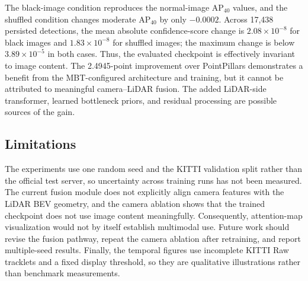 The black-image condition reproduces the normal-image AP$_{40}$ values, and
the shuffled condition changes moderate AP$_{40}$ by only $-0.0002$. Across
17,438 persisted detections, the mean absolute confidence-score change is
$2.08\times10^{-8}$ for black images and $1.83\times10^{-8}$ for shuffled
images; the maximum change is below $3.89\times10^{-5}$ in both cases. Thus,
the evaluated checkpoint is effectively invariant to image content. The
2.4945-point improvement over PointPillars demonstrates a benefit from the
MBT-configured architecture and training, but it cannot be attributed to
meaningful camera--LiDAR fusion. The added LiDAR-side transformer, learned
bottleneck priors, and residual processing are possible sources of the gain.

\subsection{Limitations}

The experiments use one random seed and the KITTI validation split rather
than the official test server, so uncertainty across training runs has not
been measured. The current fusion module does not explicitly align camera
features with the LiDAR BEV geometry, and the camera ablation shows that the
trained checkpoint does not use image content meaningfully. Consequently,
attention-map visualization would not by itself establish multimodal use.
Future work should revise the fusion pathway, repeat the camera ablation after
retraining, and report multiple-seed results. Finally, the temporal figures
use incomplete KITTI Raw tracklets and a fixed display threshold, so they are
qualitative illustrations rather than benchmark measurements.
